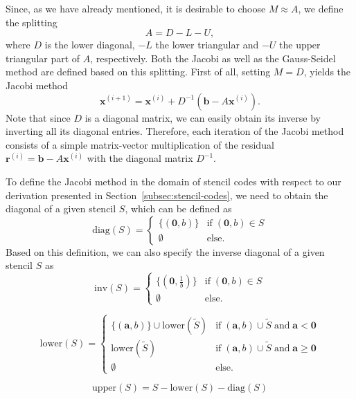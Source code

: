 Since, as we have already mentioned, it is desirable to choose $M \approx A$, we define the splitting
\begin{equation}
	A = D - L - U,
\end{equation} 
where $D$ is the lower diagonal, $-L$ the lower triangular and $-U$ the upper triangular part of $A$, respectively.
Both the Jacobi as well as the Gauss-Seidel method are defined based on this splitting.
First of all, setting $M = D$, yields the Jacobi method
\begin{equation}
	\bm{x}^{(i+1)} = \bm{x}^{(i)} + D^{-1}(\bm b - A \bm{x}^{(i)}).
	\label{eq:jacobi-method}
\end{equation}
Note that since $D$ is a diagonal matrix, we can easily obtain its inverse by inverting all its diagonal entries.
Therefore, each iteration of the Jacobi method consists of a simple matrix-vector multiplication of the residual $\bm{r}^{(i)} = \bm{b} - A \bm{x}^{(i)}$ with the diagonal matrix $D^{-1}$.

To define the Jacobi method in the domain of stencil codes with respect to our derivation presented in Section~\ref{subsec:stencil-codes}, we need to obtain the diagonal of a given stencil $S$, which can be defined as
\begin{equation}
	\text{diag}(S) = \begin{cases}
		\{(\bm{0}, b) \} & \text{if} \; (\bm 0, b) \in S \\
		\emptyset & \text{else}.
	\end{cases}
	\label{eq:stencil-diag}
\end{equation}
Based on this definition, we can also specify the inverse diagonal of a given stencil $S$ as
\begin{equation}
	\text{inv}(S) = \begin{cases}
		\{(\bm{0}, \frac{1}{b}) \} & \text{if} \; (\bm 0, b) \in S \\
		\emptyset & \text{else}.
	\end{cases}
	\label{eq:stencil-diag-inv}
\end{equation}

\begin{equation}
	\text{lower}(S) = \begin{cases}
		\{(\bm{a}, b) \} \cup \text{lower}(\tilde{S}) & \text{if} \; (\bm a, b) \cup \tilde{S} \; \text{and} \; \bm a < \bm 0 \\
		\text{lower}(\tilde{S}) & \text{if} \; (\bm a, b) \cup \tilde{S} \; \text{and} \; \bm a \geq \bm 0 \\
		\emptyset & \text{else}.
	\end{cases}
	\label{eq:stencil-lower}
\end{equation}

\begin{equation}
	\text{upper}(S) = S - \text{lower}(S) - \text{diag}(S)
\end{equation}


